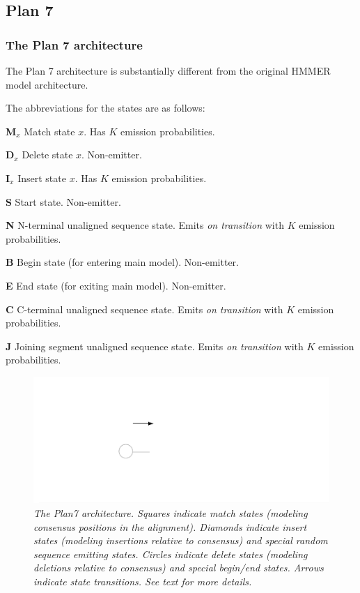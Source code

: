 \subsection{Plan 7}

\subsubsection{The Plan 7 architecture}

The Plan 7 architecture is substantially different from the original
HMMER model architecture. 

The abbreviations for the states are as follows:

\begin{wideitem}
\item [\textbf{M$_x$}] Match state $x$.  Has $K$ emission probabilities.
\item [\textbf{D$_x$}] Delete state $x$. Non-emitter.
\item [\textbf{I$_x$}] Insert state $x$. Has $K$ emission probabilities.
\item [\textbf{S}]     Start state. Non-emitter.
\item [\textbf{N}]     N-terminal unaligned sequence state. 
    Emits \textit{on transition} with $K$ emission probabilities.
\item [\textbf{B}]     Begin state (for entering main model). Non-emitter.
\item [\textbf{E}]     End state (for exiting main model). Non-emitter.
\item [\textbf{C}]     C-terminal unaligned sequence state.
    Emits \textit{on transition} with $K$ emission probabilities.
\item [\textbf{J}]     Joining segment unaligned sequence state.
    Emits \textit{on transition} with $K$ emission probabilities.
\end{wideitem}

\begin{figure}
\includegraphics{plan7}
\caption{\textit{The Plan7 architecture. Squares indicate match states
(modeling consensus positions in the alignment). Diamonds indicate
insert states (modeling insertions relative to consensus) and special
random sequence emitting states. Circles indicate delete states
(modeling deletions relative to consensus) and special begin/end
states. Arrows indicate state transitions. See text for more details.}}
\end{figure}

